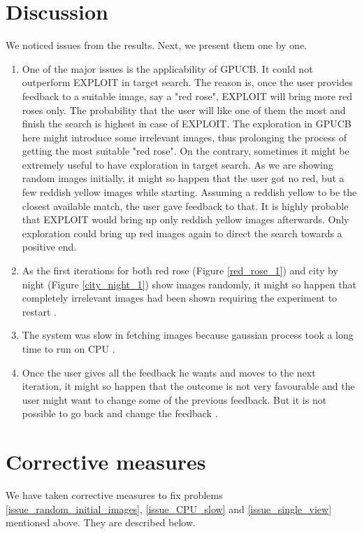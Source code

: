 \documentclass[english]{tktltiki}
\begin{document}
\section{Discussion}

We noticed issues from the results. Next, we present them one by one.

\begin{enumerate}
	\item One of the major issues is the applicability of GPUCB. It could not outperform EXPLOIT in target search. The reason is, once the user provides feedback to a suitable image, say a "red rose", EXPLOIT will bring more red roses only. The probability that the user will like one of them the most and finish the search is highest in case of EXPLOIT. The exploration in GPUCB here might introduce some irrelevant images, thus prolonging the process of getting the most suitable "red rose". On the contrary, sometimes it might be extremely useful to have exploration in target search. As we are showing random images initially, it might so happen that the user got no red, but a few reddish yellow images while starting. Assuming a reddish yellow to be the closest available match, the user gave feedback to that. It is highly probable that EXPLOIT would bring up only reddish yellow images afterwards. Only exploration could bring up red images again to direct the search towards a positive end.
	\item As the first iterations for both red rose (Figure \ref{red_rose_1}) and city by night (Figure \ref{city_night_1}) show images randomly, it might so happen that completely irrelevant images had been shown requiring the experiment to restart \label{issue_random_initial_images}.
	\item The system was slow in fetching images because gaussian process took a long time to run on CPU \label{issue_CPU_slow}.
	\item Once the user gives all the feedback he wants and moves to the next iteration, it might so happen that the outcome is not very favourable and the user might want to change some of the previous feedback. But it is not possible to go back and change the feedback \label{issue_single_view}.
\end{enumerate}


\section{Corrective measures}

We have taken corrective measures to fix problems \ref{issue_random_initial_images}, \ref{issue_CPU_slow} and \ref{issue_single_view} mentioned above. They are described below.
\end{document}
